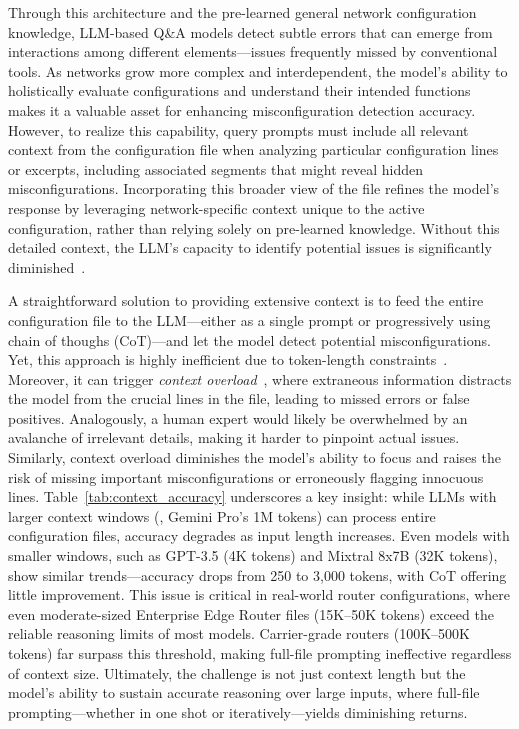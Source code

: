 Through this architecture and the pre-learned general network configuration
knowledge, LLM-based Q\&A models detect subtle errors that can emerge from
interactions among different elements—issues frequently missed by conventional
tools. As networks grow more complex and interdependent, the model’s ability to
holistically evaluate configurations and understand their intended functions
makes it a valuable asset for enhancing misconfiguration detection accuracy.
However, to realize this capability, query prompts must include all relevant
context from the configuration file when analyzing particular configuration lines
or excerpts, including associated segments that might reveal hidden
misconfigurations. Incorporating this broader view of the file refines the
model’s response by leveraging network-specific context unique to the active
configuration, rather than relying solely on pre-learned knowledge. Without
this detailed context, the LLM’s capacity to identify potential issues is
significantly diminished~\cite{liskavets2024prompt,tian2024examining,khurana2024and,
	shvartzshnaider2024llm}.

A straightforward solution to providing extensive context is to feed the entire
configuration file to the LLM—either as a single prompt or progressively using chain of thoughs (CoT)—and let
the model detect potential misconfigurations. Yet, this approach is highly inefficient
due to token-length constraints~\cite{xue2024repeat,yu2024breaking,gu2023mamba}.
Moreover, it can trigger \emph{context overload}~\cite{lican,li2024long,qian2024long},
where extraneous information distracts the model from the crucial lines in the file,
leading to missed errors or false positives. Analogously, a human expert would likely
be overwhelmed by an avalanche of irrelevant details, making it harder to pinpoint
actual issues. Similarly, context overload diminishes the model’s ability to focus
and raises the risk of missing important misconfigurations or erroneously flagging
innocuous lines.
Table~\ref{tab:context_accuracy} underscores a key insight: while LLMs with larger context windows (\eg, Gemini Pro’s 1M tokens) can process entire configuration files, accuracy degrades as input length increases. Even models with smaller windows, such as GPT-3.5 (4K tokens) and Mixtral 8x7B (32K tokens), show similar trends—accuracy drops from 250 to 3,000 tokens, with CoT offering little improvement. This issue is critical in real-world router configurations, where even moderate-sized Enterprise Edge Router files (15K–50K tokens) exceed the reliable reasoning limits of most models. Carrier-grade routers (100K–500K tokens) far surpass this threshold, making full-file prompting ineffective regardless of context size. Ultimately, the challenge is not just context length but the model’s ability to sustain accurate reasoning over large inputs, where full-file prompting—whether in one shot or iteratively—yields diminishing returns.

